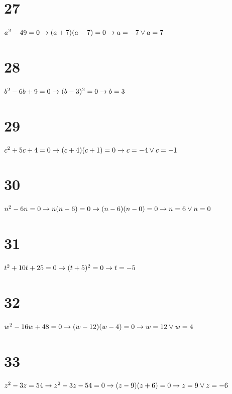 \documentclass{article}
\theoremstyle{definition}
\begin{document}
\section*{27}
$a^2-49=0\newline\rightarrow (a+7)(a-7)=0\newline\rightarrow a=-7\vee a=7$

\section*{28}
$b^2-6b+9=0\newline\rightarrow (b-3)^2=0\newline\rightarrow b=3$

\section*{29}
$c^2+5c+4=0\newline\rightarrow (c+4)(c+1)=0\newline\rightarrow c=-4\vee c=-1$

\section*{30}
$n^2-6n=0\newline\rightarrow n(n-6)=0\newline\rightarrow (n-6)(n-0)=0\newline\rightarrow n=6\vee n=0$

\section*{31}
$t^2+10t+25=0\newline\rightarrow (t+5)^2=0\newline\rightarrow t=-5$

\section*{32}
$w^2-16w+48=0\newline\rightarrow (w-12)(w-4)=0\newline\rightarrow w=12\vee w=4$

\section*{33}
$z^2-3z=54\newline\rightarrow z^2-3z-54=0\newline\rightarrow (z-9)(z+6)=0\newline\rightarrow z=9\vee z=-6$
\end{document}
